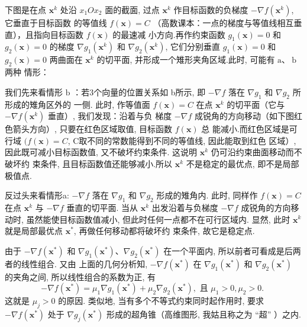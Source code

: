 
下图是在点 $ \mathbf{x}^{k} $ 处沿 $ x_{1} O x_{2} $ 面的截面, 过点 $ \mathbf{x}^{k} $ 作目标函数的负梯度 $ -\nabla f\left(\mathbf{x}^{k}\right) $, 它垂直于目标函数 的等值线 $ f(\mathbf{x})=C $ （高数课本：一点的梯度与等值线相互垂直），且指向目标函数 $ f(\mathbf{x}) $ 的最速减 小方向.再作约束函数 $ g_{1}(\mathbf{x})=0 $ 和 $ g_{2}(\mathbf{x})=0 $ 的梯度 $ \nabla g_{1}\left(\mathbf{x}^{k}\right) $ 和 $ \nabla g_{2}\left(\mathbf{x}^{k}\right) $, 它们分别垂直 $ g_{1}(\mathbf{x})=0 $ 和 $ g_{2}(\mathbf{x})=0 $ 两曲面在 $ \mathbf{x}^{k} $ 的切平面, 并形成一个雉形夹角区域.此时, 可能有 $ \mathrm{a} 、 \mathrm{~b} $ 两种 情形：

我们先来看情形 $\mathrm{b}$ ：若3个向量的位置关系如 b所示, 即 $-\nabla f$ 落在 $\nabla g_{1}$ 和 $\nabla g_{2}$ 所形成的雉角区外的 一侧. 此时, 作等值面 $f(\mathbf{x})=C$ 在点 $\mathbf{x}^{k}$ 的切平面（它与 $-\nabla f\left(\mathbf{x}^{k}\right)$ 垂直）, 我们发现：沿着与负 梯度 $-\nabla f$ 成锐角的方向移动（如下图红色箭头方向）, 只要在红色区域取值, 目标函数 $f(\mathbf{x})$ 总 能减小.而红色区域是可行域 $(f(\mathbf{x})=C$, C取不同的常数能得到不同的等值线, 因此能取到红色 区域）, 因此既可减小目标函数值, 又不破坏约束条件. 这说明 $\mathbf{x}^{k}$ 仍可沿约束曲面移动而不破坏约 束条件, 且目标函数值还能够减小.所以 $\mathbf{x}^{k}$ 不是稳定的最优点, 即不是局部极值点.

反过头来看情形a: $ -\nabla f $ 落在 $ \nabla g_{1} $ 和 $ \nabla g_{2} $ 形成的雉角内. 此时, 同样作 $ f(\mathbf{x})=C $ 在点 $ \mathbf{x}^{k} $ 与 $ -\nabla f $ 垂直的切平面. 当从 $ \mathbf{x}^{k} $ 出发沿着与负梯度 $ -\nabla f $ 成锐角的方向移动时, 虽然能使目标函数值减小, 但此时任何一点都不在可行区域内. 显然, 此时 $ \mathbf{x}^{k} $ 就是局部最优点 $ \mathbf{x}^{*} $, 再做任何移动都将破坏约 束条件, 故它是稳定点.

由于 $ -\nabla f\left(\mathbf{x}^{*}\right) $ 和 $ \nabla g_{1}\left(\mathbf{x}^{*}\right) 、 \nabla g_{2}\left(\mathbf{x}^{*}\right) $ 在一个平面内, 所以前者可看成是后两者的线性组合. 又由 上面的几何分析知, $ -\nabla f\left(\mathbf{x}^{*}\right) $ 在 $ \nabla g_{1}\left(\mathbf{x}^{*}\right) $ 和 $ \nabla g_{2}\left(\mathbf{x}^{*}\right) $ 的夹角之间, 所以线性组合的系数为正, 有
$$
-\nabla f\left(\mathbf{x}^{*}\right)=\mu_{1} \nabla g_{1}\left(\mathbf{x}^{*}\right)+\mu_{2} \nabla g_{2}\left(\mathbf{x}^{*}\right), \text { 且 } \mu_{1}>0, \mu_{2}>0 \text {. }
$$
这就是 $ \mu_{j}>0 $ 的原因. 类似地, 当有多个不等式约束同时起作用时, 要求 $ -\nabla f\left(\mathbf{x}^{*}\right) $ 处于 $ \nabla g_{j}\left(\mathbf{x}^{*}\right) $ 形成的超角锥（高维图形, 我姑且称之为 “超” ）之内.

